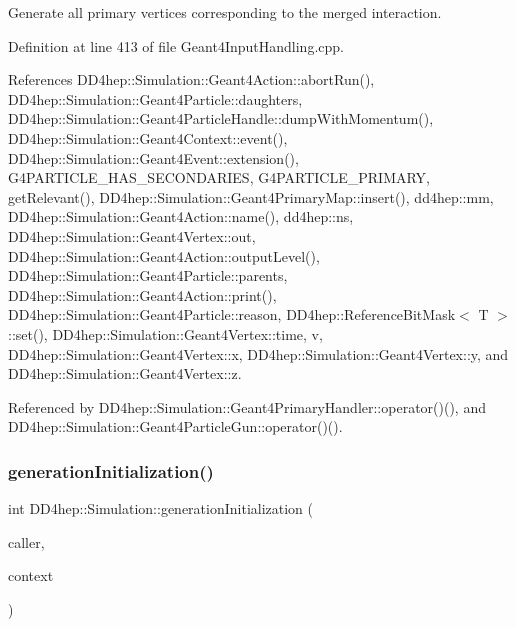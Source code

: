 Generate all primary vertices corresponding to the merged interaction. 



Definition at line 413 of file Geant4\+Input\+Handling.\+cpp.



References D\+D4hep\+::\+Simulation\+::\+Geant4\+Action\+::abort\+Run(), D\+D4hep\+::\+Simulation\+::\+Geant4\+Particle\+::daughters, D\+D4hep\+::\+Simulation\+::\+Geant4\+Particle\+Handle\+::dump\+With\+Momentum(), D\+D4hep\+::\+Simulation\+::\+Geant4\+Context\+::event(), D\+D4hep\+::\+Simulation\+::\+Geant4\+Event\+::extension(), G4\+P\+A\+R\+T\+I\+C\+L\+E\+\_\+\+H\+A\+S\+\_\+\+S\+E\+C\+O\+N\+D\+A\+R\+I\+ES, G4\+P\+A\+R\+T\+I\+C\+L\+E\+\_\+\+P\+R\+I\+M\+A\+RY, get\+Relevant(), D\+D4hep\+::\+Simulation\+::\+Geant4\+Primary\+Map\+::insert(), dd4hep\+::mm, D\+D4hep\+::\+Simulation\+::\+Geant4\+Action\+::name(), dd4hep\+::ns, D\+D4hep\+::\+Simulation\+::\+Geant4\+Vertex\+::out, D\+D4hep\+::\+Simulation\+::\+Geant4\+Action\+::output\+Level(), D\+D4hep\+::\+Simulation\+::\+Geant4\+Particle\+::parents, D\+D4hep\+::\+Simulation\+::\+Geant4\+Action\+::print(), D\+D4hep\+::\+Simulation\+::\+Geant4\+Particle\+::reason, D\+D4hep\+::\+Reference\+Bit\+Mask$<$ T $>$\+::set(), D\+D4hep\+::\+Simulation\+::\+Geant4\+Vertex\+::time, v, D\+D4hep\+::\+Simulation\+::\+Geant4\+Vertex\+::x, D\+D4hep\+::\+Simulation\+::\+Geant4\+Vertex\+::y, and D\+D4hep\+::\+Simulation\+::\+Geant4\+Vertex\+::z.



Referenced by D\+D4hep\+::\+Simulation\+::\+Geant4\+Primary\+Handler\+::operator()(), and D\+D4hep\+::\+Simulation\+::\+Geant4\+Particle\+Gun\+::operator()().

\hypertarget{namespace_d_d4hep_1_1_simulation_aaf70bd3ee9651c20efdf16a10dfa8dc8}{}\label{namespace_d_d4hep_1_1_simulation_aaf70bd3ee9651c20efdf16a10dfa8dc8} 
\subsubsection{\texorpdfstring{generation\+Initialization()}{generationInitialization()}}
{\footnotesize\ttfamily int D\+D4hep\+::\+Simulation\+::generation\+Initialization (\begin{DoxyParamCaption}\item[{const \hyperlink{class_d_d4hep_1_1_simulation_1_1_geant4_action}{Geant4\+Action} $\ast$}]{caller,  }\item[{const \hyperlink{class_d_d4hep_1_1_simulation_1_1_geant4_context}{Geant4\+Context} $\ast$}]{context }\end{DoxyParamCaption})}



